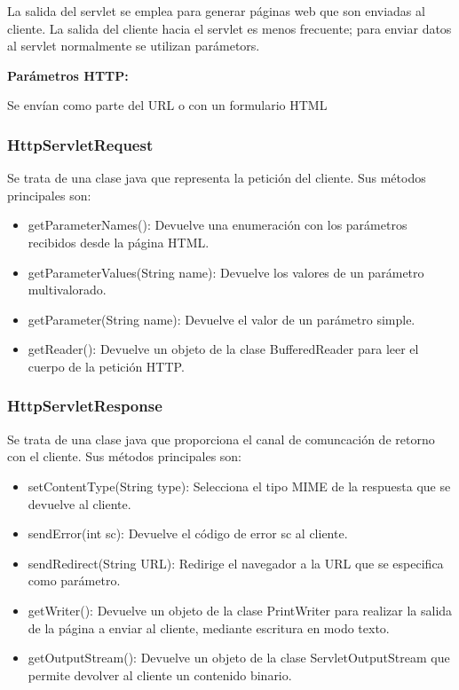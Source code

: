 \documentclass{apuntes}
\begin{document}
La salida del servlet se emplea para generar páginas web que son enviadas al cliente. La salida del cliente hacia el servlet es menos frecuente; para enviar datos al servlet normalmente se utilizan parámetors.

\textbf{Parámetros HTTP:}

Se envían como parte del URL o con un formulario HTML

\subsubsection{HttpServletRequest}
Se trata de una clase java que representa la petición del cliente. Sus métodos principales son:
\begin{itemize}
\item getParameterNames(): Devuelve una enumeración con los
parámetros recibidos desde la página HTML.
\item getParameterValues(String name): Devuelve los valores de un parámetro multivalorado.
\item getParameter(String name): Devuelve el valor de un
parámetro simple.
\item getReader(): Devuelve un objeto de la clase BufferedReader para leer el cuerpo de la petición HTTP.
\end{itemize}

\subsubsection{HttpServletResponse}
Se trata de una clase java que proporciona el canal de comuncación de retorno con el cliente. Sus métodos principales son:
\begin{itemize}
\item setContentType(String type): Selecciona el tipo MIME de
la respuesta que se devuelve al cliente.
\item sendError(int sc): Devuelve el código de error sc al cliente.
\item sendRedirect(String URL): Redirige el navegador a la URL que se especifica como parámetro.
\item getWriter(): Devuelve un objeto de la clase PrintWriter
para realizar la salida de la página a enviar al cliente, mediante escritura en modo texto.
\item getOutputStream(): Devuelve un objeto de la clase
ServletOutputStream que permite devolver al cliente un
contenido binario.
\end{itemize}
\end{document}
